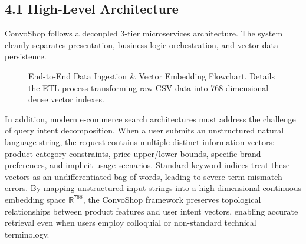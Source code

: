\documentclass[12pt,a4paper]{article}
\begin{document}
\subsection*{4.1 High-Level Architecture}
\label{sec:4.1}
ConvoShop follows a decoupled 3-tier microservices architecture. The system cleanly separates presentation, business logic orchestration, and vector data persistence.

\begin{figure}[h]
\centering
{}
\caption{End-to-End Data Ingestion \& Vector Embedding Flowchart. Details the ETL process transforming raw CSV data into 768-dimensional dense vector indexes.}
\label{fig:4_1}
\end{figure}



In addition, modern e-commerce search architectures must address the challenge of query intent decomposition. When a user submits an unstructured natural language string, the request contains multiple distinct information vectors: product category constraints, price upper/lower bounds, specific brand preferences, and implicit usage scenarios. Standard keyword indices treat these vectors as an undifferentiated bag-of-words, leading to severe term-mismatch errors. By mapping unstructured input strings into a high-dimensional continuous embedding space $\mathbb{R}^{768}$, the ConvoShop framework preserves topological relationships between product features and user intent vectors, enabling accurate retrieval even when users employ colloquial or non-standard technical terminology.
\end{document}
